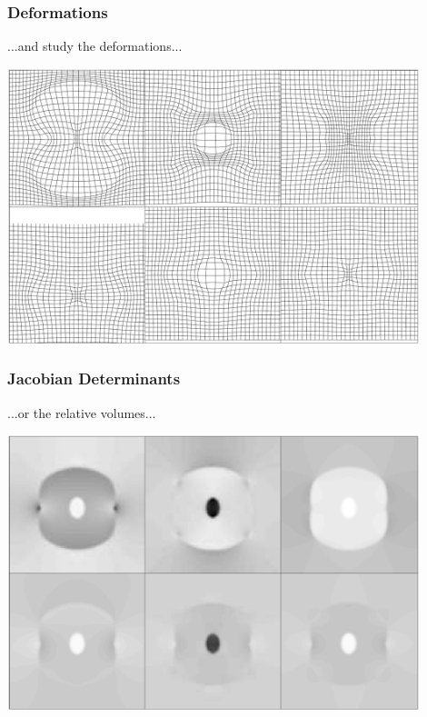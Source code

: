 \begin{frame}
\frametitle{Deformations}
...and study the deformations...
\begin{center}
\includegraphics[width=0.9\textwidth]{deformations}
\end{center}
\end{frame}

\begin{frame}
\frametitle{Jacobian Determinants}
...or the relative volumes...
\begin{center}
\includegraphics[width=0.9\textwidth]{jacobians}
\end{center}
\end{frame}

